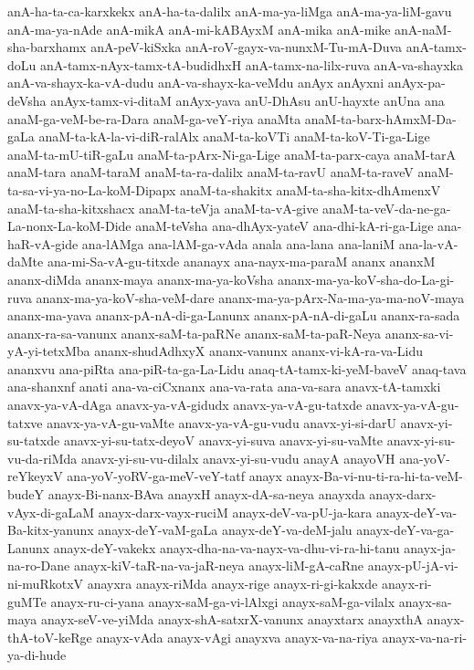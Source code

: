 {anA-ha-ta-ca-karxkekx
anA-ha-ta-dalilx
anA-ma-ya-liMga
anA-ma-ya-liM-gavu
anA-ma-ya-nAde
anA-mikA
anA-mi-kABAyxM
anA-mika
anA-mike
anA-naM-sha-barxhamx
anA-peV-kiSxka
anA-roV-gayx-va-nunxM-Tu-mA-Duva
anA-tamx-doLu
anA-tamx-nAyx-tamx-tA-budidhxH
anA-tamx-na-lilx-ruva
anA-va-shayxka
anA-va-shayx-ka-vA-dudu
anA-va-shayx-ka-veMdu
anAyx
anAyxni
anAyx-pa-deVsha
anAyx-tamx-vi-ditaM
anAyx-yava
anU-DhAsu
anU-hayxte
anUna
ana
anaM-ga-veM-be-ra-Dara
anaM-ga-veY-riya
anaMta
anaM-ta-barx-hAmxM-Da-gaLa
anaM-ta-kA-la-vi-diR-ralAlx
anaM-ta-koVTi
anaM-ta-koV-Ti-ga-Lige
anaM-ta-mU-tiR-gaLu
anaM-ta-pArx-Ni-ga-Lige
anaM-ta-parx-caya
anaM-tarA
anaM-tara
anaM-taraM
anaM-ta-ra-dalilx
anaM-ta-ravU
anaM-ta-raveV
anaM-ta-sa-vi-ya-no-La-koM-Dipapx
anaM-ta-shakitx
anaM-ta-sha-kitx-dhAmenxV
anaM-ta-sha-kitxshacx
anaM-ta-teVja
anaM-ta-vA-give
anaM-ta-veV-da-ne-ga-La-nonx-La-koM-Dide
anaM-teVsha
ana-dhAyx-yateV
ana-dhi-kA-ri-ga-Lige
ana-haR-vA-gide
ana-lAMga
ana-lAM-ga-vAda
anala
ana-lana
ana-laniM
ana-la-vA-daMte
ana-mi-Sa-vA-gu-titxde
ananayx
ana-nayx-ma-paraM
ananx
ananxM
ananx-diMda
ananx-maya
ananx-ma-ya-koVsha
ananx-ma-ya-koV-sha-do-La-gi-ruva
ananx-ma-ya-koV-sha-veM-dare
ananx-ma-ya-pArx-Na-ma-ya-ma-noV-maya
ananx-ma-yava
ananx-pA-nA-di-ga-Lanunx
ananx-pA-nA-di-gaLu
ananx-ra-sada
ananx-ra-sa-vanunx
ananx-saM-ta-paRNe
ananx-saM-ta-paR-Neya
ananx-sa-vi-yA-yi-tetxMba
ananx-shudAdhxyX
ananx-vanunx
ananx-vi-kA-ra-va-Lidu
ananxvu
ana-piRta
ana-piR-ta-ga-La-Lidu
anaq-tA-tamx-ki-yeM-baveV
anaq-tava
ana-shanxnf
anati
ana-va-ciCxnanx
ana-va-rata
ana-va-sara
anavx-tA-tamxki
anavx-ya-vA-dAga
anavx-ya-vA-gidudx
anavx-ya-vA-gu-tatxde
anavx-ya-vA-gu-tatxve
anavx-ya-vA-gu-vaMte
anavx-ya-vA-gu-vudu
anavx-yi-si-darU
anavx-yi-su-tatxde
anavx-yi-su-tatx-deyoV
anavx-yi-suva
anavx-yi-su-vaMte
anavx-yi-su-vu-da-riMda
anavx-yi-su-vu-dilalx
anavx-yi-su-vudu
anayA
anayoVH
ana-yoV-reYkeyxV
ana-yoV-yoRV-ga-meV-veY-tatf
anayx
anayx-Ba-vi-nu-ti-ra-hi-ta-veM-budeY
anayx-Bi-nanx-BAva
anayxH
anayx-dA-sa-neya
anayxda
anayx-darx-vAyx-di-gaLaM
anayx-darx-vayx-ruciM
anayx-deV-va-pU-ja-kara
anayx-deY-va-Ba-kitx-yanunx
anayx-deY-vaM-gaLa
anayx-deY-va-deM-jalu
anayx-deY-va-ga-Lanunx
anayx-deY-vakekx
anayx-dha-na-va-nayx-va-dhu-vi-ra-hi-tanu
anayx-ja-na-ro-Dane
anayx-kiV-taR-na-va-jaR-neya
anayx-liM-gA-caRne
anayx-pU-jA-vi-ni-muRkotxV
anayxra
anayx-riMda
anayx-rige
anayx-ri-gi-kakxde
anayx-ri-guMTe
anayx-ru-ci-yana
anayx-saM-ga-vi-lAlxgi
anayx-saM-ga-vilalx
anayx-sa-maya
anayx-seV-ve-yiMda
anayx-shA-satxrX-vanunx
anayxtarx
anayxthA
anayx-thA-toV-keRge
anayx-vAda
anayx-vAgi
anayxva
anayx-va-na-riya
anayx-va-na-ri-ya-di-hude
}
